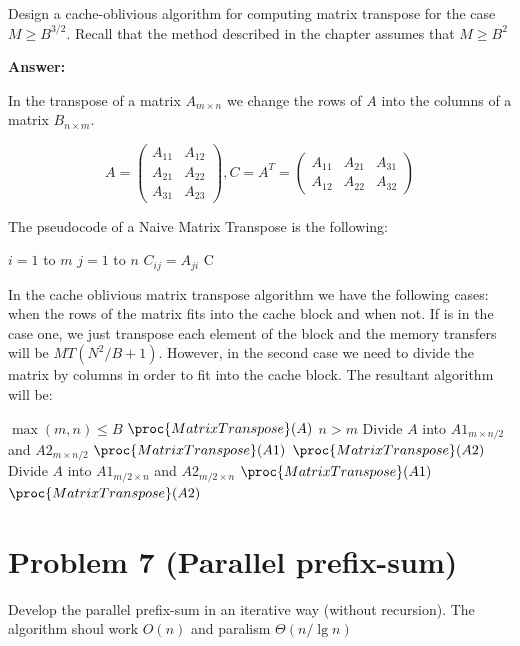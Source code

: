 \documentclass{article}
\begin{document}
Design a cache-oblivious algorithm for computing matrix transpose for the case $M\geq B^{3/2}$. Recall that the method described in the chapter assumes that $M\geq B^2$

\textbf{Answer:}

In the transpose of a matrix $A_{m\times n}$ we change the rows of $A$ into the columns of a matrix $B_{n\times m}$.


$$A = \begin{pmatrix}
A_{11} & A_{12} \\
A_{21} & A_{22} \\
A_{31} & A_{23} 
\end{pmatrix}, C = A^T = \begin{pmatrix}
A_{11} & A_{21} & A_{31}\\
A_{12} & A_{22} & A_{32}
\end{pmatrix}$$

The pseudocode of a Naive Matrix Transpose is the following: 
\begin{codebox}
\li \For $i=1$ to $m$ \Do
\li \For $j=1$ to $n$ \Do
\li $C_{ij} = A_{ji}$ \End\End
\li \Return C
\end{codebox}

In the cache oblivious matrix transpose algorithm we have the following cases: when the rows of the matrix fits into the cache block and when not. If is in the case one, we just transpose each element of the block and the memory transfers will be $MT(N^2/B +1)$. However, in the second case we need to divide the matrix by columns in order to fit into the cache block. The resultant algorithm will be:

\begin{codebox}
\li \If $\max(m,n) \leq B$ \Do
\li \Return $\proc{MatrixTranspose}(A)$ \End
\li \Else \If $n>m$ \Do
\li Divide $A$ into $A1_{m\times n/2}$ and $A2_{m \times n/2}$ 
\li $\proc{MatrixTranspose}(A1)$ 
\li $\proc{MatrixTranspose}(A2)$ 
\li \Else
\li Divide $A$ into $A1_{m/2\times n}$ and $A2_{m/2 \times n}$ 
\li $\proc{MatrixTranspose}(A1)$ 
\li $\proc{MatrixTranspose}(A2)$ 
\end{codebox}


\section*{Problem 7 (Parallel prefix-sum)}

Develop the parallel prefix-sum in an iterative way (without recursion). The algorithm shoul work $O(n)$ and paralism $\Theta(n/ \lg n)$
\end{document}
